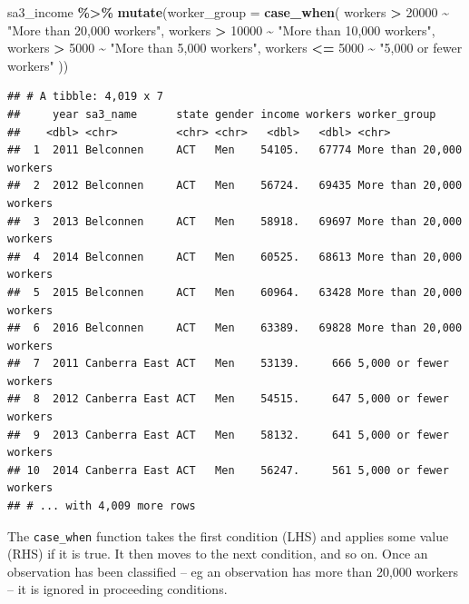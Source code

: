 \documentclass[
]{book}
\newenvironment{Shaded}{\begin{snugshade}}{\end{snugshade}}
\newcommand{\DataTypeTok}[1]{\textcolor[rgb]{0.13,0.29,0.53}{#1}}
\newcommand{\DecValTok}[1]{\textcolor[rgb]{0.00,0.00,0.81}{#1}}
\newcommand{\KeywordTok}[1]{\textcolor[rgb]{0.13,0.29,0.53}{\textbf{#1}}}
\newcommand{\NormalTok}[1]{#1}
\newcommand{\OperatorTok}[1]{\textcolor[rgb]{0.81,0.36,0.00}{\textbf{#1}}}
\newcommand{\StringTok}[1]{\textcolor[rgb]{0.31,0.60,0.02}{#1}}
\begin{document}
\begin{Shaded}
\begin{Highlighting}[]
\NormalTok{sa3\_income }\OperatorTok{\%\textgreater{}\%}\StringTok{ }
\StringTok{  }\KeywordTok{mutate}\NormalTok{(}\DataTypeTok{worker\_group =} \KeywordTok{case\_when}\NormalTok{(}
\NormalTok{    workers }\OperatorTok{\textgreater{}}\StringTok{ }\DecValTok{20000} \OperatorTok{\textasciitilde{}}\StringTok{ "More than 20,000 workers"}\NormalTok{,}
\NormalTok{    workers }\OperatorTok{\textgreater{}}\StringTok{ }\DecValTok{10000} \OperatorTok{\textasciitilde{}}\StringTok{ "More than 10,000 workers"}\NormalTok{,}
\NormalTok{    workers }\OperatorTok{\textgreater{}}\StringTok{  }\DecValTok{5000} \OperatorTok{\textasciitilde{}}\StringTok{ "More than 5,000 workers"}\NormalTok{,}
\NormalTok{    workers }\OperatorTok{\textless{}=}\StringTok{ }\DecValTok{5000} \OperatorTok{\textasciitilde{}}\StringTok{ "5,000 or fewer workers"}
\NormalTok{  ))}
\end{Highlighting}
\end{Shaded}

\begin{verbatim}
## # A tibble: 4,019 x 7
##     year sa3_name      state gender income workers worker_group            
##    <dbl> <chr>         <chr> <chr>   <dbl>   <dbl> <chr>                   
##  1  2011 Belconnen     ACT   Men    54105.   67774 More than 20,000 workers
##  2  2012 Belconnen     ACT   Men    56724.   69435 More than 20,000 workers
##  3  2013 Belconnen     ACT   Men    58918.   69697 More than 20,000 workers
##  4  2014 Belconnen     ACT   Men    60525.   68613 More than 20,000 workers
##  5  2015 Belconnen     ACT   Men    60964.   63428 More than 20,000 workers
##  6  2016 Belconnen     ACT   Men    63389.   69828 More than 20,000 workers
##  7  2011 Canberra East ACT   Men    53139.     666 5,000 or fewer workers  
##  8  2012 Canberra East ACT   Men    54515.     647 5,000 or fewer workers  
##  9  2013 Canberra East ACT   Men    58132.     641 5,000 or fewer workers  
## 10  2014 Canberra East ACT   Men    56247.     561 5,000 or fewer workers  
## # ... with 4,009 more rows
\end{verbatim}

The \texttt{case\_when} function takes the first condition (LHS) and applies some value (RHS) if it is true. It then moves to the next condition, and so on. Once an observation has been classified -- eg an observation has more than 20,000 workers -- it is ignored in proceeding conditions.
\end{document}

